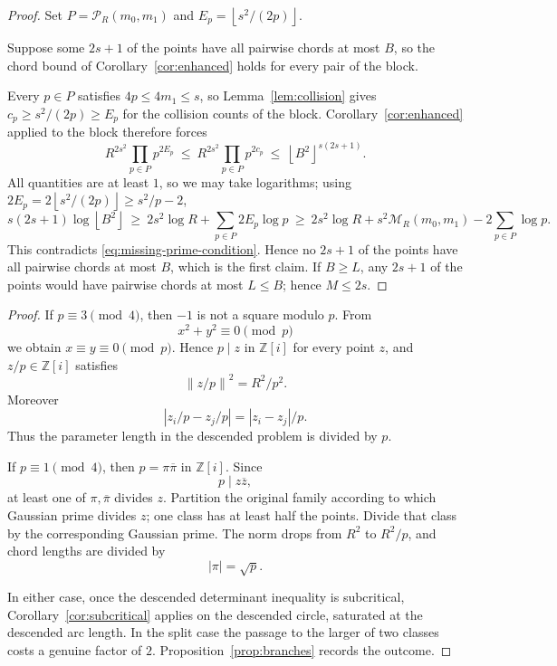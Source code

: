 \documentclass[11pt]{article}
\newcommand{\GI}{\mathbb Z[i]}
\newcommand{\Norm}[1]{\left\lVert#1\right\rVert^2}
\newcommand{\floor}[1]{\left\lfloor #1 \right\rfloor}
\newcommand{\conj}[1]{\overline{#1}}
\newcommand{\M}{\mathcal M}
\begin{document}
\begin{proof}
Set \(P=\mathcal P_R(m_0,m_1)\) and \(E_p=\floor{s^2/(2p)}\).

Suppose some \(2s+1\) of the points have all pairwise chords at most \(B\), so the chord bound of Corollary~\ref{cor:enhanced} holds for every pair of the block.

Every \(p\in P\) satisfies \(4p\le 4m_1\le s\), so Lemma~\ref{lem:collision} gives \(c_p\ge s^2/(2p)\ge E_p\) for the collision counts of the block.
Corollary~\ref{cor:enhanced} applied to the block therefore forces
\[
  R^{2s^2}\prod_{p\in P}p^{2E_p}
  \ \le\
  R^{2s^2}\prod_{p\in P}p^{2c_p}
  \ \le\
  \floor{B^2}^{s(2s+1)} .
\]
All quantities are at least \(1\), so we may take logarithms; using \(2E_p=2\floor{s^2/(2p)}\ge s^2/p-2\),
\[
  s(2s+1)\log \floor{B^2}
  \ \ge\ 2s^2\log R+\sum_{p\in P}2E_p\log p
  \ \ge\ 2s^2\log R+s^2\M_R(m_0,m_1)-2\sum_{p\in P}\log p .
\]
This contradicts \eqref{eq:missing-prime-condition}.
Hence no \(2s+1\) of the points have all pairwise chords at most \(B\), which is the first claim.
If \(B\ge L\), any \(2s+1\) of the points would have pairwise chords at most \(L\le B\); hence \(M\le 2s\).
\end{proof}

\descentbranch*

\begin{proof}
If \(p\equiv3\pmod4\), then \(-1\) is not a square modulo \(p\).
From
\[
  x^2+y^2\equiv0\pmod p
\]
we obtain \(x\equiv y\equiv0\pmod p\).
Hence \(p\mid z\) in \(\GI\) for every point \(z\), and \(z/p\in\GI\) satisfies
\[
  \Norm{z/p}=R^2/p^2.
\]
Moreover
\[
  |z_i/p-z_j/p|=|z_i-z_j|/p.
\]
Thus the parameter length in the descended problem is divided by \(p\).

If \(p\equiv1\pmod4\), then \(p=\pi\conj\pi\) in \(\GI\).
Since
\[
  p\mid z\conj z,
\]
at least one of \(\pi,\conj\pi\) divides \(z\).
Partition the original family according to which Gaussian prime divides \(z\); one class has at least half the points.
Divide that class by the corresponding Gaussian prime.
The norm drops from \(R^2\) to \(R^2/p\), and chord lengths are divided by
\[
  |\pi|=\sqrt p.
\]

In either case, once the descended determinant inequality is subcritical, Corollary~\ref{cor:subcritical} applies on the descended circle, saturated at the descended arc length.
In the split case the passage to the larger of two classes costs a genuine factor of \(2\).
Proposition~\ref{prop:branches} records the outcome.
\end{proof}
\end{document}
